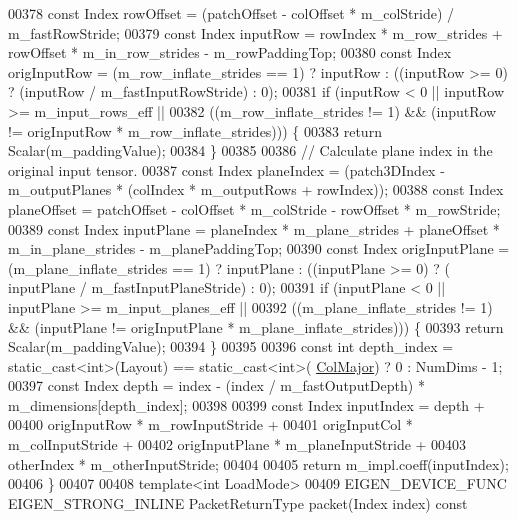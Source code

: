 \begin{DoxyCode}
00378     \textcolor{keyword}{const} Index rowOffset = (patchOffset - colOffset * m\_colStride) / m\_fastRowStride;
00379     \textcolor{keyword}{const} Index inputRow = rowIndex * m\_row\_strides + rowOffset * m\_in\_row\_strides - m\_rowPaddingTop;
00380     \textcolor{keyword}{const} Index origInputRow = (m\_row\_inflate\_strides == 1) ? inputRow : ((inputRow >= 0) ? (inputRow / 
      m\_fastInputRowStride) : 0);
00381     \textcolor{keywordflow}{if} (inputRow < 0 || inputRow >= m\_input\_rows\_eff ||
00382         ((m\_row\_inflate\_strides != 1) && (inputRow != origInputRow * m\_row\_inflate\_strides))) \{
00383       \textcolor{keywordflow}{return} Scalar(m\_paddingValue);
00384     \}
00385 
00386     \textcolor{comment}{// Calculate plane index in the original input tensor.}
00387     \textcolor{keyword}{const} Index planeIndex = (patch3DIndex - m\_outputPlanes * (colIndex * m\_outputRows + rowIndex));
00388     \textcolor{keyword}{const} Index planeOffset = patchOffset - colOffset * m\_colStride - rowOffset * m\_rowStride;
00389     \textcolor{keyword}{const} Index inputPlane = planeIndex * m\_plane\_strides + planeOffset * m\_in\_plane\_strides - 
      m\_planePaddingTop;
00390     \textcolor{keyword}{const} Index origInputPlane = (m\_plane\_inflate\_strides == 1) ? inputPlane : ((inputPlane >= 0) ? (
      inputPlane / m\_fastInputPlaneStride) : 0);
00391     \textcolor{keywordflow}{if} (inputPlane < 0 || inputPlane >= m\_input\_planes\_eff ||
00392         ((m\_plane\_inflate\_strides != 1) && (inputPlane != origInputPlane * m\_plane\_inflate\_strides))) \{
00393       \textcolor{keywordflow}{return} Scalar(m\_paddingValue);
00394     \}
00395 
00396     \textcolor{keyword}{const} \textcolor{keywordtype}{int} depth\_index = \textcolor{keyword}{static\_cast<}\textcolor{keywordtype}{int}\textcolor{keyword}{>}(Layout) == static\_cast<int>(
      \hyperlink{group__enums_ggaacded1a18ae58b0f554751f6cdf9eb13a0cbd4bdd0abcfc0224c5fcb5e4f6669a}{ColMajor}) ? 0 : NumDims - 1;
00397     \textcolor{keyword}{const} Index depth = index - (index / m\_fastOutputDepth) * m\_dimensions[depth\_index];
00398 
00399     \textcolor{keyword}{const} Index inputIndex = depth +
00400         origInputRow * m\_rowInputStride +
00401         origInputCol * m\_colInputStride +
00402         origInputPlane * m\_planeInputStride +
00403         otherIndex * m\_otherInputStride;
00404 
00405     \textcolor{keywordflow}{return} m\_impl.coeff(inputIndex);
00406   \}
00407 
00408   \textcolor{keyword}{template}<\textcolor{keywordtype}{int} LoadMode>
00409   EIGEN\_DEVICE\_FUNC EIGEN\_STRONG\_INLINE PacketReturnType packet(Index index)\textcolor{keyword}{ const}

\end{DoxyCode}

